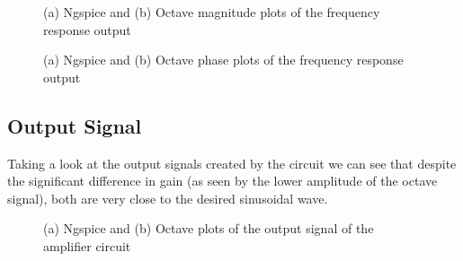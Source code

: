 \begin{figure}[h]
	\centering
	\caption{(a) Ngspice and (b) Octave magnitude plots of the frequency response output}
	\label{fig:mag_comp}
\end{figure}
\vspace{20pt}
\begin{figure}[h]
	\centering
	\caption{(a) Ngspice and (b) Octave phase plots of the frequency response output}
	\label{fig:ph_comp}
\end{figure}

\pagebreak
\subsection{Output Signal}
\hspace{12pt} Taking a look at the output signals created by the circuit we can see that despite the significant difference in gain (as seen by the lower amplitude of the octave signal), both are very close to the desired sinusoidal wave.

\begin{figure}[h]
	\centering
	\caption{(a) Ngspice and (b) Octave plots of the output signal of the amplifier circuit}
	\label{fig:out_comp}
\end{figure}

